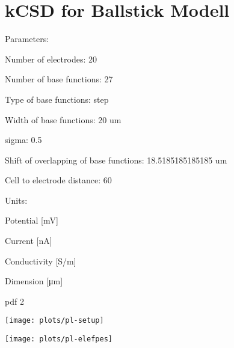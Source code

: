 \documentclass[10pt,a4paper]{report}
\author{Dorottya Cserpan}
\begin{document}
\section{kCSD for Ballstick Modell}




Parameters:

\begin{Schunk}
\begin{Soutput}
Number of electrodes: 20
\end{Soutput}
\begin{Soutput}
Number of base functions: 27
\end{Soutput}
\begin{Soutput}
Type of base functions: step
\end{Soutput}
\begin{Soutput}
Width of base functions: 20 um
\end{Soutput}
\begin{Soutput}
sigma: 0.5
\end{Soutput}
\begin{Soutput}
Shift of overlapping of base functions: 18.5185185185185 um
\end{Soutput}
\begin{Soutput}
Cell to electrode distance: 60
\end{Soutput}
\end{Schunk}

Units:
\begin{Schunk}
\begin{Soutput}
Potential 	  [mV]
\end{Soutput}
\begin{Soutput}
Current      [nA]
\end{Soutput}
\begin{Soutput}
Conductivity [S/m]
\end{Soutput}
\begin{Soutput}
Dimension 	  [μm]
\end{Soutput}
\end{Schunk}




\begin{Schunk}
\begin{Soutput}
pdf 
  2 
\end{Soutput}
\end{Schunk}
\texttt{[image: plots/pl-setup]}

\texttt{[image: plots/pl-elefpes]}


\begin{Schunk}
\begin{Soutput}

\end{Soutput}
\end{Schunk}
\end{document}
